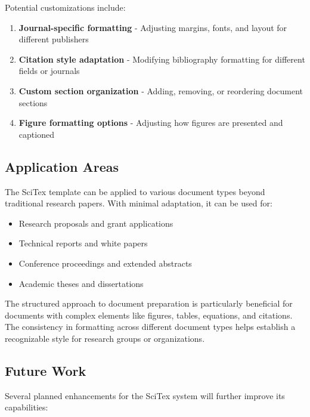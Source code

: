 
Potential customizations include:

\begin{enumerate}
    \item \textbf{Journal-specific formatting} - Adjusting margins, fonts, and layout for different publishers
    \item \textbf{Citation style adaptation} - Modifying bibliography formatting for different fields or journals
    \item \textbf{Custom section organization} - Adding, removing, or reordering document sections
    \item \textbf{Figure formatting options} - Adjusting how figures are presented and captioned
\end{enumerate}

\subsection{Application Areas}
\label{subsec:applications}

The SciTex template can be applied to various document types beyond traditional research papers. With minimal adaptation, it can be used for:

\begin{itemize}
    \item Research proposals and grant applications
    \item Technical reports and white papers
    \item Conference proceedings and extended abstracts
    \item Academic theses and dissertations
\end{itemize}

The structured approach to document preparation is particularly beneficial for documents with complex elements like figures, tables, equations, and citations. The consistency in formatting across different document types helps establish a recognizable style for research groups or organizations.

\subsection{Future Work}
\label{subsec:future-work}

Several planned enhancements for the SciTex system will further improve its capabilities:

